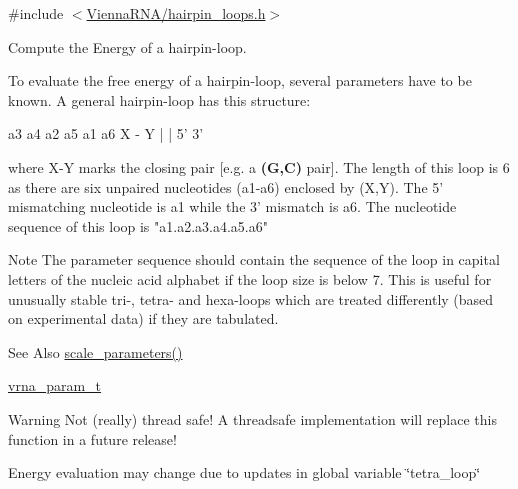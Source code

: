 {\ttfamily \#include $<$\hyperlink{hairpin__loops_8h}{Vienna\-R\-N\-A/hairpin\-\_\-loops.\-h}$>$}



Compute the Energy of a hairpin-\/loop. 

To evaluate the free energy of a hairpin-\/loop, several parameters have to be known. A general hairpin-\/loop has this structure\-:\par
 
\begin{DoxyPre}
      a3 a4
    a2     a5
    a1     a6
      X - Y
      |   |
      5'  3'
\end{DoxyPre}
 where X-\/\-Y marks the closing pair \mbox{[}e.\-g. a {\bfseries (G,C)} pair\mbox{]}. The length of this loop is 6 as there are six unpaired nucleotides (a1-\/a6) enclosed by (X,Y). The 5' mismatching nucleotide is a1 while the 3' mismatch is a6. The nucleotide sequence of this loop is "a1.\-a2.\-a3.\-a4.\-a5.\-a6" \par
 \begin{DoxyNote}{Note}
The parameter sequence should contain the sequence of the loop in capital letters of the nucleic acid alphabet if the loop size is below 7. This is useful for unusually stable tri-\/, tetra-\/ and hexa-\/loops which are treated differently (based on experimental data) if they are tabulated. 
\end{DoxyNote}
\begin{DoxySeeAlso}{See Also}
\hyperlink{group__energy__parameters_ga541f2cf7436e9bc939b0a49b24baf987}{scale\-\_\-parameters()} 

\hyperlink{group__energy__parameters_ga8a69ca7d787e4fd6079914f5343a1f35}{vrna\-\_\-param\-\_\-t} 
\end{DoxySeeAlso}
\begin{DoxyWarning}{Warning}
Not (really) thread safe! A threadsafe implementation will replace this function in a future release!\par
Energy evaluation may change due to updates in global variable \char`\"{}tetra\-\_\-loop\char`\"{}
\end{DoxyWarning}

